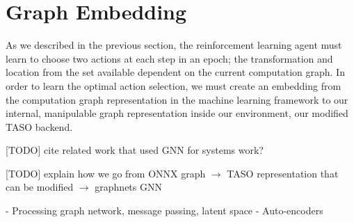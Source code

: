 \section{Graph Embedding}

As we described in the previous section, the reinforcement learning agent must learn to choose two actions at each step in an epoch; the transformation and location from the set available dependent on the current computation graph. In order to learn the optimal action selection, we must create an embedding from the computation graph representation in the machine learning framework to our internal, manipulable graph representation inside our environment, our modified TASO backend.

[TODO] cite related work that used GNN for systems work?

[TODO] explain how we go from ONNX graph $\rightarrow$ TASO representation that can be modified $\rightarrow$ graph\textunderscore nets GNN

- Processing graph network, message passing, latent space
- Auto-encoders
